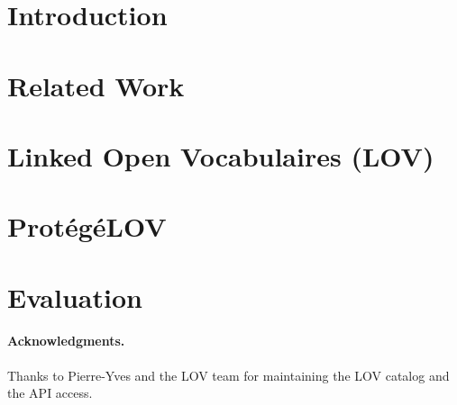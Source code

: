 \documentclass[runningheads,a4paper]{llncs}
\begin{document}
\vspace{-3mm}
\section{Introduction}\label{sec:introduction}




\vspace{-3mm}
\section{Related Work}\label{sec:soa}
\vspace{-3mm}



\vspace{-3mm}
\section{Linked Open Vocabulaires (LOV)}\label{sec:lov}
\vspace{-3mm}




\vspace{-3mm}
\section{Prot{\'e}g{\'e}LOV}\label{sec:classification}



\vspace{-3mm}
\section{Evaluation}\label{sec:conclusion}




\vspace{-1mm}
\paragraph{\textbf{Acknowledgments.}} %
Thanks to Pierre-Yves and the LOV team for maintaining the LOV catalog and the API access.
\vspace{-3mm}


\end{document}
